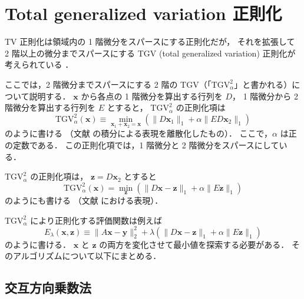 %

\section{Total generalized variation 正則化}

TV 正則化は領域内の 1 階微分をスパースにする正則化だが，
それを拡張して 2 階以上の微分までスパースにする
TGV (total generalized variation) 正則化が考えられている
\cite{Bredies2010}．

ここでは，2 階微分までスパースにする
2 階の TGV（「$\mathrm{TGV}_{\alpha}^2$」と書かれる）について説明する．
$\bm{x}$ から各点の 1 階微分を算出する行列を $D$，
1 階微分から 2 階微分を算出する行列を $E$ とすると，
$\mathrm{TGV}_{\alpha}^2$ の正則化項は
\begin{equation}
    \mathrm{TGV}_{\alpha}^2(\bm{x}) \equiv
    \min_{\bm{x}_1 + \bm{x}_2 = \bm{x}} \left(
    \|D \bm{x}_1\|_1 + \alpha \|E D \bm{x}_2\|_1
    \right)
\end{equation}
のように書ける
（文献 \cite{Bredies2010} の積分による表現を離散化したもの）．
ここで，$\alpha$ は正の定数である．
この正則化項では，1 階微分と 2 階微分をスパースにしている．

$\mathrm{TGV}_{\alpha}^2$ の正則化項は，
$\bm{z} = D \bm{x}_2$
とすると
\begin{equation}
    \mathrm{TGV}_{\alpha}^2(\bm{x}) =
    \min_{\bm{z}} \left(
    \|D \bm{x} - \bm{z}\|_1 + \alpha \|E \bm{z}\|_1
    \right)
\end{equation}
のようにも書ける
（文献 \cite{Li2016} における表現）．

$\mathrm{TGV}_{\alpha}^2$ により正則化する評価関数は例えば
\begin{equation}
    E_{\lambda}(\bm{x}, \bm{z}) \equiv \|A \bm{x} - \bm{y}\|_2^2
    + \lambda \left( \|D \bm{x} - \bm{z}\|_1 + \alpha \|E \bm{z}\|_1 \right)
\end{equation}
のように書ける．
$\bm{x}$ と $\bm{z}$ の両方を変化させて最小値を探索する必要がある．
そのアルゴリズムについて以下にまとめる．

\subsection{交互方向乗数法}

